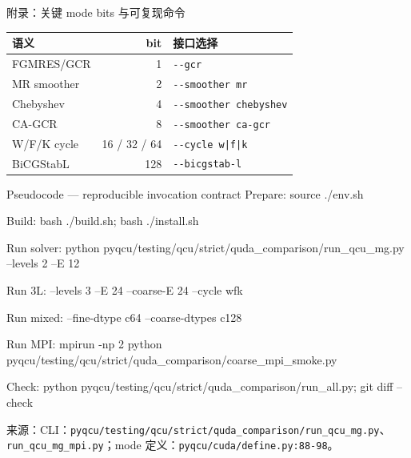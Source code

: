 \documentclass[UTF8,aspectratio=169,11pt]{ctexbeamer}
\newcommand{\source}[1]{%
  \vspace{0.06em}\par{\raggedright\scriptsize\color{muted}来源：#1\par}}
\newcommand{\code}[1]{\nolinkurl{#1}}
\begin{document}
\begin{frame}[t]{附录：关键 mode bits 与可复现命令}
  \begin{center}
    \scriptsize
    \begin{tabular}{@{}lrl@{}}
      \toprule
      语义 & bit & 接口选择 \\
      \midrule
      FGMRES/GCR & 1 & \code{--gcr} \\
      MR smoother & 2 & \code{--smoother mr} \\
      Chebyshev & 4 & \code{--smoother chebyshev} \\
      CA-GCR & 8 & \code{--smoother ca-gcr} \\
      W/F/K cycle & 16 / 32 / 64 & \code{--cycle w|f|k} \\
      BiCGStabL & 128 & \code{--bicgstab-l} \\
      \bottomrule
    \end{tabular}
  \end{center}
  \vspace{0.15em}
  \begin{block}{Pseudocode — reproducible invocation contract}
    \scriptsize\ttfamily
    Prepare: source ./env.sh\par
    Build: bash ./build.sh; bash ./install.sh\par
    Run solver: python pyqcu/testing/qcu/strict/quda\_comparison/run\_qcu\_mg.py --levels 2 --E 12\par
    Run 3L: --levels 3 --E 24 --coarse-E 24 --cycle w\textbar{}f\textbar{}k\par
    Run mixed: --fine-dtype c64 --coarse-dtypes c128\par
    Run MPI: mpirun -np 2 python pyqcu/testing/qcu/strict/quda\_comparison/coarse\_mpi\_smoke.py\par
    Check: python pyqcu/testing/qcu/strict/quda\_comparison/run\_all.py; git diff --check
  \end{block}
  \source{CLI：\code{pyqcu/testing/qcu/strict/quda_comparison/run_qcu_mg.py}、\code{run_qcu_mg_mpi.py}；mode 定义：\code{pyqcu/cuda/define.py:88-98}。}
\end{frame}
\end{document}
